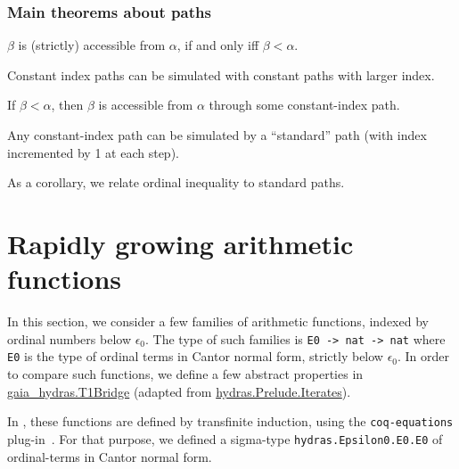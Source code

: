 
\subsubsection{Main theorems about paths}

$\beta$ is (strictly) accessible from $\alpha$, if and only iff
$\beta<\alpha$.


Constant index paths can be simulated with constant paths with larger index.
 


If $\beta<\alpha$, then $\beta$ is accessible from $\alpha$
through some constant-index path.


Any constant-index path can be simulated by a ``standard'' path (with index incremented by 1 at each step).


As a corollary, we relate ordinal inequality to standard paths.





\section{Rapidly growing arithmetic functions}

In this section, we consider a few families of arithmetic functions, indexed by ordinal numbers below $\epsilon_0$.
The type of such families is \texttt{E0 -> nat -> nat} where
\texttt{E0} is the type of ordinal terms in Cantor normal form, strictly below $\epsilon_0$.
In order to compare such functions, we define a few abstract properties in
\href{../theories/html/gaia_hydras.T1Bridge.html}{gaia\_hydras.T1Bridge} (adapted from 
\href{../theories/html/hydras.Prelude.Iterates.html}{hydras.Prelude.Iterates}).









In \HydrasLib, these functions are defined by transfinite induction, using the \texttt{coq-equations} plug-in~\cite{sozeau:hal-01671777}. For that purpose, we defined a sigma-type
\texttt{hydras.Epsilon0.E0.E0} of ordinal-terms in Cantor normal form. 


